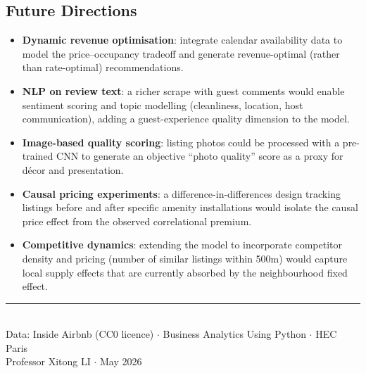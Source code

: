 \documentclass[12pt, a4paper]{article}
\begin{document}
\subsection{Future Directions}

\begin{itemize}[itemsep=4pt]
  \item \textbf{Dynamic revenue optimisation}: integrate calendar availability data to model the price--occupancy tradeoff and generate revenue-optimal (rather than rate-optimal) recommendations.
  \item \textbf{NLP on review text}: a richer scrape with guest comments would enable sentiment scoring and topic modelling (cleanliness, location, host communication), adding a guest-experience quality dimension to the model.
  \item \textbf{Image-based quality scoring}: listing photos could be processed with a pre-trained CNN to generate an objective ``photo quality'' score as a proxy for décor and presentation.
  \item \textbf{Causal pricing experiments}: a difference-in-differences design tracking listings before and after specific amenity installations would isolate the causal price effect from the observed correlational premium.
  \item \textbf{Competitive dynamics}: extending the model to incorporate competitor density and pricing (number of similar listings within 500m) would capture local supply effects that are currently absorbed by the neighbourhood fixed effect.
\end{itemize}

\vspace{1.2cm}
\begin{center}
  {\color{airbnbCoral}\rule{0.6\textwidth}{1.5pt}}\\[0.4cm]
  {\small\color{airbnbGrey}
    Data: Inside Airbnb (CC0 licence) $\cdot$
    Business Analytics Using Python $\cdot$ HEC Paris\\
    Professor Xitong LI $\cdot$ May 2026}
\end{center}
\end{document}
